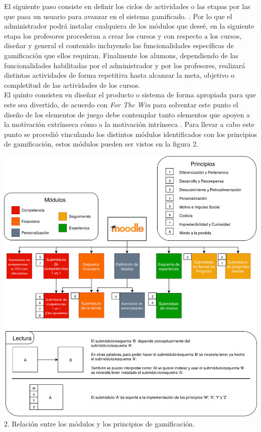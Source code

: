     \noindent
    El siguiente paso consiste en definir los ciclos de actividades o las etapas
    por las que pasa un usuario para avanzar en el sistema gamificado.
    \cite[p. 66]{ForTheWin}. Por lo que el administrador podrá instalar cualquiera
    de los módulos que deseé, en la siguiente etapa los profesores procederan a crear
    los cursos y con respecto a los cursos, diseñar y general el contenido incluyendo
    las funcionalidades específicas de gamificación que ellos requiran. Finalmente
    los alumons, dependiendo de las funcionalidades habilitadas por el administrador
    y por los profesores, realizará distintas actividades de forma repetitiva hasta
    alcanzar la meta, objetivo o completitud de las actividades de los cursos.\\

    \noindent
    El quinto consisten en diseñar el producto o sistema de forma apropiada para
    que este sea divertido, de acuerdo con {\it For The Win} para solventar este
    punto el diseño de los elementos de juego debe contemplar tanto elementos que
    apoyen a la motivación extrínseca cómo a la motivación intrínseca \cite[p. 68]%
    {ForTheWin}. Para llevar a cabo este punto se procedió vinculando los distintos
    módulos identificados con los principios de gamificación, estos módulos pueden
    ser vistos en la figura 2.

        \begin{center}
        \includegraphics[width=1\linewidth]{images/modulosOctalysis}
        \small 2. Relación entre los módulos y los principios de gamificación.
        \end{center}


